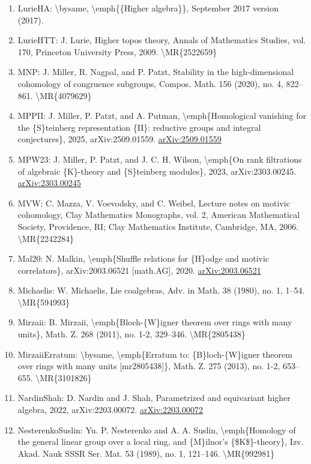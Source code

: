 \documentclass[11pt]{article}
\begin{document}
\begin{enumerate}[leftmargin=*]
  \item LurieHA: \textbackslash{}bysame, \textbackslash{}emph\{\{Higher algebra\}\}, September 2017 version (2017).
  \item LurieHTT: J. Lurie, Higher topos theory, Annals of Mathematics Studies, vol. 170, Princeton University Press, 2009. \textbackslash{}MR\{2522659\}
  \item MNP: J. Miller, R. Nagpal, and P. Patzt, Stability in the high-dimensional cohomology of congruence subgroups, Compos. Math. 156 (2020), no. 4, 822--861. \textbackslash{}MR\{4079629\}
  \item MPPII: J. Miller, P. Patzt, and A. Putman, \textbackslash{}emph\{Homological vanishing for the \{S\}teinberg representation \{II\}: reductive groups and integral conjectures\}, 2025, arXiv:2509.01559. \href{https://arxiv.org/abs/2509.01559}{arXiv:2509.01559}
  \item MPW23: J. Miller, P. Patzt, and J. C. H. Wilson, \textbackslash{}emph\{On rank filtrations of algebraic \{K\}-theory and \{S\}teinberg modules\}, 2023, arXiv:2303.00245. \href{https://arxiv.org/abs/2303.00245}{arXiv:2303.00245}
  \item MVW: C. Mazza, V. Voevodsky, and C. Weibel, Lecture notes on motivic cohomology, Clay Mathematics Monographs, vol. 2, American Mathematical Society, Providence, RI; Clay Mathematics Institute, Cambridge, MA, 2006. \textbackslash{}MR\{2242284\}
  \item Mal20: N. Malkin, \textbackslash{}emph\{Shuffle relations for \{H\}odge and motivic correlators\}, arXiv:2003.06521 [math.AG], 2020. \href{https://arxiv.org/abs/2003.06521}{arXiv:2003.06521}
  \item Michaelis: W. Michaelis, Lie coalgebras, Adv. in Math. 38 (1980), no. 1, 1--54. \textbackslash{}MR\{594993\}
  \item Mirzaii: B. Mirzaii, \textbackslash{}emph\{Bloch-\{W\}igner theorem over rings with many units\}, Math. Z. 268 (2011), no. 1-2, 329--346. \textbackslash{}MR\{2805438\}
  \item MirzaiiErratum: \textbackslash{}bysame, \textbackslash{}emph\{Erratum to: \{B\}loch-\{W\}igner theorem over rings with many units [mr2805438]\}, Math. Z. 275 (2013), no. 1-2, 653--655. \textbackslash{}MR\{3101826\}
  \item NardinShah: D. Nardin and J. Shah, Parametrized and equivariant higher algebra, 2022, arXiv:2203.00072. \href{https://arxiv.org/abs/2203.00072}{arXiv:2203.00072}
  \item NesterenkoSuslin: Yu. P. Nesterenko and A. A. Suslin, \textbackslash{}emph\{Homology of the general linear group over a local ring, and \{M\}ilnor's \{\$K\$\}-theory\}, Izv. Akad. Nauk SSSR Ser. Mat. 53 (1989), no. 1, 121--146. \textbackslash{}MR\{992981\}

\end{enumerate}
\end{document}
